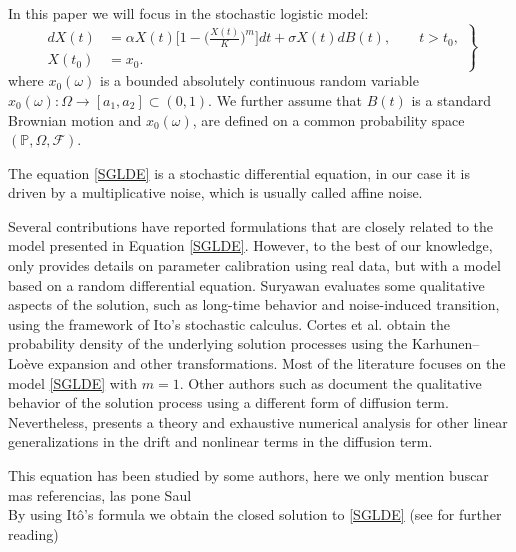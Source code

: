 \documentclass[12pt, reqno]{amsart}
\newcommand{\Pb}{\mathbb P}
\newcommand{\1}{{\bf 1}}
\newcommand{\2}{{\bf 2}}
\newcommand{\cf}{\mathcal F}
\theoremstyle{definition}
\theoremstyle{remark}
\numberwithin{equation}{section}
\begin{document}
In this paper we will focus in the stochastic logistic model: 
\begin{equation}\label{SGLDE}
  \left.\begin{aligned} dX(t)&= \alpha X(t)\Bigg[1-\Bigg(\frac{X(t)}{K}\Bigg)^m\Bigg]dt + \sigma X(t) dB(t),\qquad t>t_0,\\
 X(t_0)&= x_0.
 \end{aligned}
 \right\}
 \end{equation}
%
where $x_0(\omega)$ is a bounded absolutely continuous random variable 
$x_0(\omega):\Omega \rightarrow [a_1,a_2]\subset (0,1)$.
We further assume that $B(t)$ is a standard Brownian motion and  $x_0(\omega)$, are defined 
on a common probability space $(\Pb,\Omega,\cf)$.  

The equation \eqref{SGLDE} is a stochastic differential equation, 
in our case it is driven by a multiplicative noise, which is usually called affine noise.

Several contributions have reported formulations that are closely related to the model presented
in Equation \eqref{SGLDE}. However, to the best of our knowledge, only \cite{Bevia2023} provides
details on parameter calibration using real data, but with a model based on a random
differential equation. Suryawan \cite{su} evaluates some qualitative aspects of the solution, 
such as long-time behavior and noise-induced transition, using the framework of Ito's stochastic
calculus. Cortes et al. \cite{Cortes2019} obtain the probability density of the underlying
solution processes using the Karhunen–Lo\`{e}ve expansion and other transformations. Most of the
literature focuses on the model \eqref{SGLDE} with $m=1$. 
Other authors such as \cite{Liu2013, Braumann2008} document the qualitative behavior of the
solution process using a different form of diffusion term. Nevertheless, \cite{Schurz2007} 
presents a theory and exhaustive numerical analysis for other linear generalizations in the drift and nonlinear terms in the diffusion term.

This equation has been studied by some authors, here we only mention 
\cite{su} {\color{red}  buscar mas referencias, las pone Saul}\\






By using It\^o's formula we obtain the closed solution to \eqref{SGLDE} (see \cite{su} for further reading) 
\end{document}
